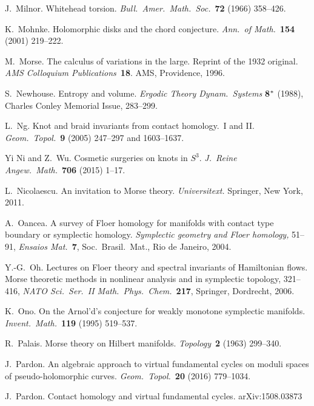 \documentclass[12pt,twoside]{amsart}
\theoremstyle{plain}
\numberwithin{figure}{section}
\numberwithin{equation}{section}
\begin{document}
\begin{thebibliography}{999}
J.\ Milnor.
Whitehead torsion. 
{\it Bull.\ Amer.\ Math.\ Soc.}~{\bf 72} (1966) 358--426.

K.\ Mohnke.
Holomorphic disks and the chord conjecture. 
{\it Ann.\ of Math.}~{\bf 154} (2001) 219--222. 

M.\ Morse.
The calculus of variations in the large. Reprint of the 1932 original. 
{\it AMS Colloquium Publications}~{\bf 18}. AMS, Providence, 1996.


S.\ Newhouse.
Entropy and volume.
{\it Ergodic Theory Dynam.\ Systems} {\bf 8$\sp *$} (1988),
Charles Conley Memorial Issue, 283--299.

L.\ Ng.
Knot and braid invariants from contact homology.\ I and II. 
{\it Geom.\ Topol.}~{\bf 9} (2005) 247--297 and 1603--1637.

Yi Ni and Z.\ Wu.
Cosmetic surgeries on knots in $S^3$. 
{\it J.\ Reine Angew.\ Math.}~{\bf 706} (2015) 1--17.


L.\ Nicolaescu.
An invitation to Morse theory. 
{\it Universitext.} Springer, New York, 2011.

A.\ Oancea.
A survey of Floer homology for manifolds with contact type boundary or symplectic homology. 
{\it Symplectic geometry and Floer homology,} 51--91, 
{\em Ensaios Mat.}~{\bf 7}, Soc.\ Brasil.\ Mat., Rio de Janeiro, 2004.

Y.-G.\ Oh.
Lectures on Floer theory and spectral invariants of Hamiltonian flows. 
Morse theoretic methods in nonlinear analysis and in symplectic topology, 321--416,
{\it NATO Sci.\ Ser.\ II Math.\ Phys.\ Chem.}~{\bf 217}, Springer, Dordrecht, 2006. 

K.\ Ono.
On the Arnol'd's conjecture for weakly monotone symplectic manifolds. 
{\it Invent.\ Math.}~{\bf 119} (1995) 519--537.

R.\ Palais.
Morse theory on Hilbert manifolds. 
{\it Topology}~{\bf 2} (1963) 299--340.

J.\ Pardon.
An algebraic approach to virtual fundamental cycles on moduli spaces of pseudo-holomorphic curves. 
{\it Geom.\ Topol.}~{\bf 20} (2016) 779--1034.

J.\ Pardon.
Contact homology and virtual fundamental cycles.
arXiv:1508.03873 


\end{thebibliography}
\end{document}
